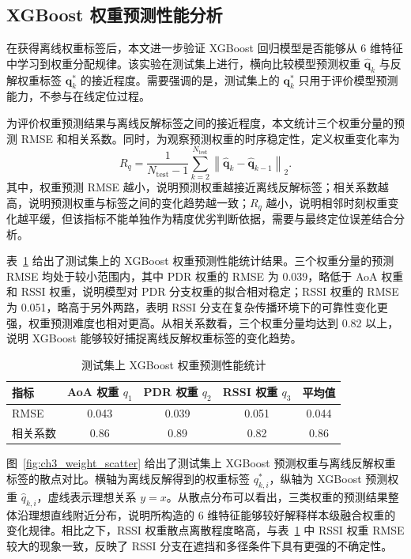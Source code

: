 \subsection{XGBoost 权重预测性能分析}
\label{subsec:3_6_3}

在获得离线权重标签后，本文进一步验证 XGBoost 回归模型是否能够从 6 维特征中学习到权重分配规律。该实验在测试集上进行，横向比较模型预测权重 \(\hat{\mathbf{q}}_k\) 与反解权重标签 \(\mathbf{q}_k^\ast\) 的接近程度。需要强调的是，测试集上的 \(\mathbf{q}_k^\ast\) 只用于评价模型预测能力，不参与在线定位过程。

为评价权重预测结果与离线反解标签之间的接近程度，本文统计三个权重分量的预测 RMSE 和相关系数。同时，为观察预测权重的时序稳定性，定义权重变化率为
\begin{equation}
R_q
=
\frac{1}{N_{\mathrm{test}}-1}
\sum_{k=2}^{N_{\mathrm{test}}}
\left\|
\hat{\mathbf{q}}_k-
\hat{\mathbf{q}}_{k-1}
\right\|_2 .
\label{eq:3_47_weight_change_rate}
\end{equation}
其中，权重预测 RMSE 越小，说明预测权重越接近离线反解标签；相关系数越高，说明预测权重与标签之间的变化趋势越一致；\(R_q\) 越小，说明相邻时刻权重变化越平缓，但该指标不能单独作为精度优劣判断依据，需要与最终定位误差结合分析。

表~\ref{tab:ch3_weight_prediction_metrics} 给出了测试集上的 XGBoost 权重预测性能统计结果。三个权重分量的预测 RMSE 均处于较小范围内，其中 PDR 权重的 RMSE 为 0.039，略低于 AoA 权重和 RSSI 权重，说明模型对 PDR 分支权重的拟合相对稳定；RSSI 权重的 RMSE 为 0.051，略高于另外两路，表明 RSSI 分支在复杂传播环境下的可靠性变化更强，权重预测难度也相对更高。从相关系数看，三个权重分量均达到 0.82 以上，说明 XGBoost 能够较好捕捉离线反解权重标签的变化趋势。

\begin{table}[htbp]
    \centering
    \caption{测试集上 XGBoost 权重预测性能统计}
    \label{tab:ch3_weight_prediction_metrics}
    \begin{tabular}{lcccc}
        \toprule
        \textbf{指标} & \textbf{AoA 权重 \(q_1\)} & \textbf{PDR 权重 \(q_2\)} & \textbf{RSSI 权重 \(q_3\)} & \textbf{平均值} \\
        \midrule
        RMSE & 0.043 & 0.039 & 0.051 & 0.044 \\
        相关系数 & 0.86 & 0.89 & 0.82 & 0.86 \\
        \bottomrule
    \end{tabular}
\end{table}

图~\ref{fig:ch3_weight_scatter} 给出了测试集上 XGBoost 预测权重与离线反解权重标签的散点对比。横轴为离线反解得到的权重标签 \(q_{k,i}^\ast\)，纵轴为 XGBoost 预测权重 \(\hat q_{k,i}\)，虚线表示理想关系 \(y=x\)。从散点分布可以看出，三类权重的预测结果整体沿理想直线附近分布，说明所构造的 6 维特征能够较好解释样本级融合权重的变化规律。相比之下，RSSI 权重散点离散程度略高，与表~\ref{tab:ch3_weight_prediction_metrics} 中 RSSI 权重 RMSE 较大的现象一致，反映了 RSSI 分支在遮挡和多径条件下具有更强的不确定性。

